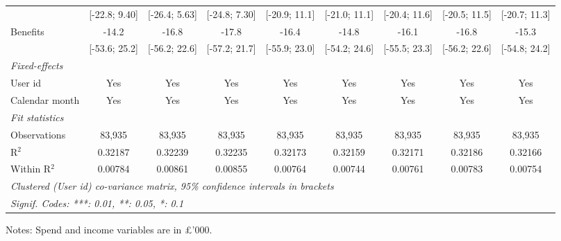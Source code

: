\begin{table}[htbp]
\begin{threeparttable}[b]
\begin{tabular}{lcccccccc}
                                     & [-22.8; 9.40]   & [-26.4; 5.63]   & [-24.8; 7.30]   & [-20.9; 11.1]   & [-21.0; 11.1]   & [-20.4; 11.6]   & [-20.5; 11.5]   & [-20.7; 11.3]\\   
         Benefits                    & -14.2           & -16.8           & -17.8           & -16.4           & -14.8           & -16.1           & -16.8           & -15.3\\   
                                     & [-53.6; 25.2]   & [-56.2; 22.6]   & [-57.2; 21.7]   & [-55.9; 23.0]   & [-54.2; 24.6]   & [-55.5; 23.3]   & [-56.2; 22.6]   & [-54.8; 24.2]\\   
         \midrule
         \emph{Fixed-effects}\\
         User id                     & Yes             & Yes             & Yes             & Yes             & Yes             & Yes             & Yes             & Yes\\  
         Calendar month              & Yes             & Yes             & Yes             & Yes             & Yes             & Yes             & Yes             & Yes\\  
         \midrule
         \emph{Fit statistics}\\
         Observations                & 83,935          & 83,935          & 83,935          & 83,935          & 83,935          & 83,935          & 83,935          & 83,935\\  
         R$^2$                       & 0.32187         & 0.32239         & 0.32235         & 0.32173         & 0.32159         & 0.32171         & 0.32186         & 0.32166\\  
         Within R$^2$                & 0.00784         & 0.00861         & 0.00855         & 0.00764         & 0.00744         & 0.00761         & 0.00783         & 0.00754\\  
         \midrule \midrule
         \multicolumn{9}{l}{\emph{Clustered (User id) co-variance matrix, 95\% confidence intervals in brackets}}\\
         \multicolumn{9}{l}{\emph{Signif. Codes: ***: 0.01, **: 0.05, *: 0.1}}\\
      \end{tabular}
      
      \begin{tablenotes}\footnotesize
         \item Notes: Spend and income variables are in \pounds'000.
      \end{tablenotes}
   \end{threeparttable}
\end{table}


